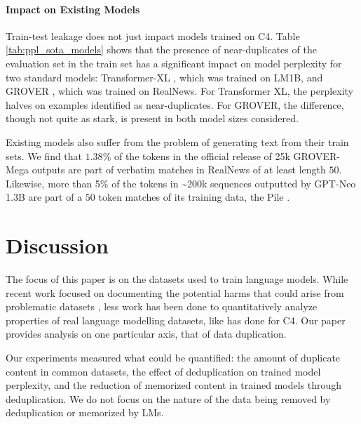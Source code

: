 \paragraph{Impact on Existing Models} \label{sec:eval-existing-models}
Train-test leakage does not just impact models trained on C4.
Table \ref{tab:ppl_sota_models} shows that
the presence of near-duplicates of the evaluation set
in the train set has a significant impact on model perplexity for two standard models: Transformer-XL \citep{dai2019transformer}, which was trained on LM1B, and GROVER \citep{zellers2019defending}, which was trained on RealNews.
For Transformer XL, the perplexity halves on examples identified as near-duplicates.
For GROVER, the difference, though not quite as stark, is present in both model sizes considered.

Existing models also suffer from the problem of generating text from their train sets.
We find that $1.38\%$ of the tokens in the official release of 25k GROVER-Mega outputs
are part of verbatim matches in RealNews of at least length $50$.
Likewise, more than 5\% of the tokens in \textasciitilde 200k sequences outputted by GPT-Neo 1.3B \citep{gpt-neo} are part of a $50$ token matches of its training data, the Pile \citep{pile}.

\section{Discussion}
The focus of this paper is on the datasets used to train language models.
While recent work focused on documenting the potential harms that could arise from problematic datasets  \cite{bender2018data, gebru2020datasheets}, less work has been done to 
quantitatively analyze properties of real language modelling datasets, like \citet{dodge2021documenting} has done for C4.
Our paper provides analysis on one particular axis, that of data duplication.

Our experiments measured what could be quantified: the amount of duplicate content in common datasets, the effect of deduplication on trained model perplexity, and the reduction of memorized content in trained models through deduplication.
We do not focus on the nature of the data being removed by deduplication or memorized by LMs.

